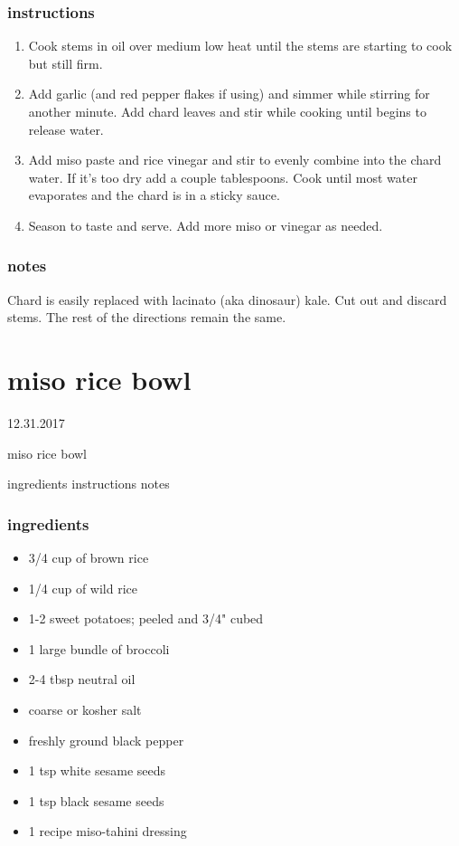 \documentclass[]{book}
\providecommand{\tightlist}{%
  \setlength{\itemsep}{0pt}\setlength{\parskip}{0pt}}
\begin{document}
\hypertarget{instructions-4}{%
\subsection{instructions}\label{instructions-4}}

\begin{enumerate}
\def\labelenumi{\arabic{enumi}.}
\tightlist
\item
  Cook stems in oil over medium low heat until the stems are starting to cook but still firm.
\item
  Add garlic (and red pepper flakes if using) and simmer while stirring for another minute. Add chard leaves and
  stir while cooking until begins to release water.
\item
  Add miso paste and rice vinegar and stir to evenly combine into the chard water. If it's too dry add a couple
  tablespoons. Cook until most water evaporates and the chard is in a sticky sauce.
\item
  Season to taste and serve. Add more miso or vinegar as needed.
\end{enumerate}

\hypertarget{notes-4}{%
\subsection{notes}\label{notes-4}}

Chard is easily replaced with lacinato (aka dinosaur) kale. Cut out and discard stems. The rest of the directions
remain the same.

\hypertarget{miso-rice-bowl}{%
\chapter{miso rice bowl}\label{miso-rice-bowl}}

12.31.2017

miso rice bowl

ingredients \textbar{}
instructions \textbar{}
notes \textbar{}

\hypertarget{ingredients-5}{%
\subsection{ingredients}\label{ingredients-5}}

\begin{itemize}
\tightlist
\item
  3/4 cup of brown rice
\item
  1/4 cup of wild rice
\item
  1-2 sweet potatoes; peeled and 3/4" cubed
\item
  1 large bundle of broccoli
\item
  2-4 tbsp neutral oil
\item
  coarse or kosher salt
\item
  freshly ground black pepper
\item
  1 tsp white sesame seeds
\item
  1 tsp black sesame seeds
\item
  1 recipe miso-tahini dressing
\end{itemize}
\end{document}

